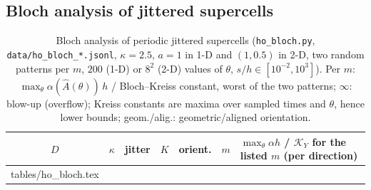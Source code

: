 \documentclass[11pt,a4paper]{article}
\makeatletter
\theoremstyle{plain}
\theoremstyle{definition}
\theoremstyle{remark}
\numberwithin{equation}{section}
\newcommand{\inputrows}[1]{\@@input #1 }%
\makeatother
\begin{document}
\subsection{Bloch analysis of jittered supercells}

\begin{table}[t]
\centering
\caption{Bloch analysis of periodic jittered supercells (\texttt{ho\_bloch.py}, \texttt{data/ho\_bloch\_*.jsonl}, $\kappa=2.5$, $a=1$ in 1-D and $(1,0.5)$ in 2-D, two random patterns per $m$, $200$ (1-D) or $8^2$ (2-D) values of $\theta$, $s/h\in[10^{-2},10^3]$). Per $m$: $\max_\theta\alpha(\hat A(\theta))\,h$ / Bloch--Kreiss constant, worst of the two patterns; $\infty$: blow-up (overflow); Kreiss constants are maxima over sampled times and $\theta$, hence lower bounds; geom./alig.: geometric/aligned orientation.}\label{tab:bloch}
\footnotesize
\begin{tabular}{cccccclll}
\toprule
$D$ & $\kappa$ & jitter & $K$ & orient. & $m$ & \multicolumn{3}{l}{$\max_\theta\alpha h$ / $\mathcal K_Y$ for the listed $m$ (per direction)}\\
\midrule
\inputrows{tables/ho_bloch.tex}
\bottomrule
\end{tabular}
\end{table}
\end{document}
